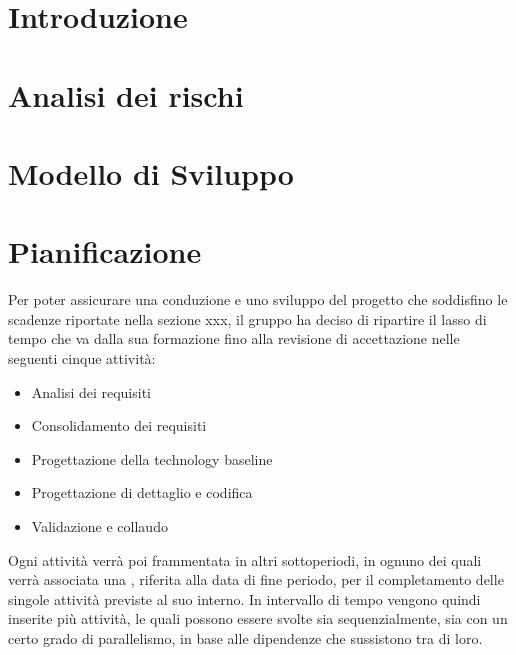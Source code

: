\documentclass[]{article}
\begin{document}
	
	\newpage


	\section{Introduzione}
	
	\newpage

	\section{Analisi dei rischi}
	
	\newpage

	\section{Modello di Sviluppo}
	
	\newpage

	\section{Pianificazione}
	
	
	Per poter assicurare una conduzione e uno sviluppo del progetto che soddisfino le scadenze riportate nella sezione xxx, il gruppo ha deciso di ripartire il lasso di tempo che va dalla sua formazione fino alla revisione di accettazione nelle seguenti cinque attività:
	
	\begin{itemize}
		\item Analisi dei requisiti
		\item Consolidamento dei requisiti
		\item Progettazione della technology baseline
		\item Progettazione di dettaglio e codifica
		\item Validazione e collaudo
	\end{itemize}
	
	Ogni attività verrà poi frammentata in altri sottoperiodi, in ognuno dei quali verrà associata una ,
	riferita alla data di fine periodo, per il completamento delle singole attività previste al suo interno.
	In intervallo di tempo vengono quindi inserite più attività, le quali possono essere svolte sia sequenzialmente,
	sia con un certo grado di parallelismo, in base alle dipendenze che sussistono tra di loro.
	
\end{document}
